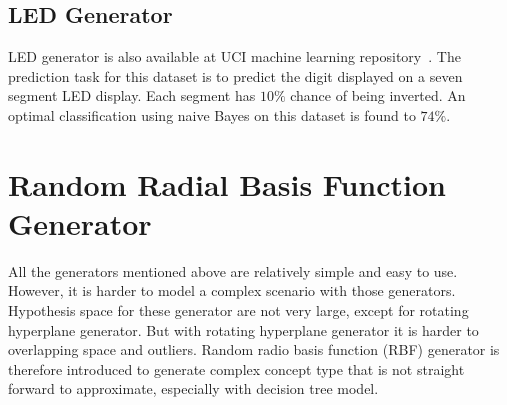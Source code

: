 \documentclass[a4paper, 11pt, oneside]{book}
\begin{document}
\subsection{LED Generator}
LED generator is also available at UCI machine learning repository~\cite{internet:ucirepo}. The prediction task for this dataset is to predict the digit displayed on a seven segment LED display. Each segment has $10\%$ chance of being inverted. An optimal classification using naive Bayes on this dataset is found to $74\%$. 

\section{Random Radial Basis Function Generator}
All the generators mentioned above are relatively simple and easy to use. However, it is harder to model a complex scenario with those generators. Hypothesis space for these generator are not very large, except for rotating hyperplane generator. But with rotating hyperplane generator it is harder to overlapping space and outliers. Random radio basis function (RBF) generator is therefore introduced to generate complex concept type that is not straight forward to approximate, especially with decision tree model.
\end{document}
